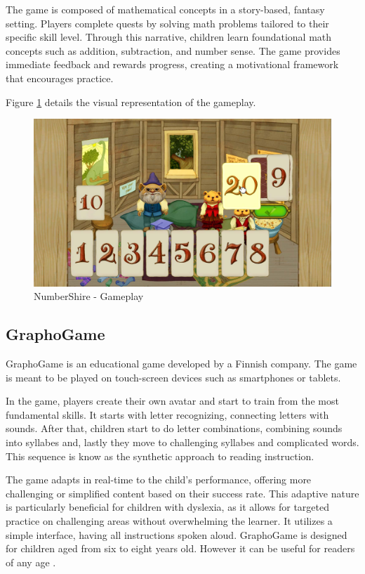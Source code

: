 The game is composed of mathematical concepts in a story-based, fantasy setting. Players complete quests by solving math problems tailored to their specific skill level. Through this narrative, children learn foundational math concepts such as addition, subtraction, and number sense. The game provides immediate feedback and rewards progress, creating a motivational framework that encourages practice.

Figure \ref{fig:numberShire} details the visual representation of the gameplay.

\begin{figure}[!h]
    \centering
    \includegraphics[width=0.8\linewidth]{Chapters/related_work_img/NumberShire_gameplay02.jpg}
    \caption{NumberShire - Gameplay}
    \label{fig:numberShire}
\end{figure}


\subsection*{GraphoGame}

GraphoGame \cite{graphogamesoftware} is an educational game developed by a Finnish company. The game is meant to be played on touch-screen devices such as smartphones or tablets.

In the game, players create their own avatar and start to train from the most fundamental skills. It starts with letter recognizing, connecting letters with sounds. After that, children start to do letter combinations, combining sounds into syllabes and, lastly they move to challenging syllabes and complicated words. This sequence is know as the synthetic approach to reading instruction.

The game adapts in real-time to the child’s performance, offering more challenging or simplified content based on their success rate. This adaptive nature is particularly beneficial for children with dyslexia, as it allows for targeted practice on challenging areas without overwhelming the learner. It utilizes a simple interface, having all instructions spoken aloud. GraphoGame is designed for children aged from six to eight years old. However it can be useful for readers of any age \cite{ronimus2019supporting}.

